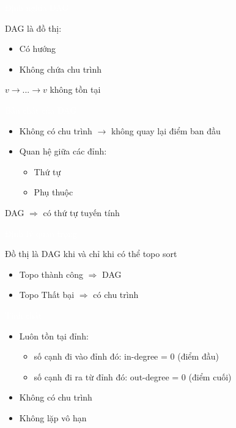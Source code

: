 \documentclass{beamer}
\title{\hlred{DAG - Directed Acyclic Graph}}
\author{Group 3}
\date{\hlcyan{03/2026}}
\newcommand{\hlblue}[1]{\textcolor{myblue}{#1}}
\newcommand{\hlgreen}[1]{\textcolor{mygreen}{#1}}
\newcommand{\hlred}[1]{\textcolor{myred}{#1}}
\newcommand{\hlpurple}[1]{\textcolor{mypurple}{#1}}
\newcommand{\hlwhite}[1]{\textcolor{white}{#1}}
\begin{document}
\frame{\titlepage}


\begin{frame}{\hlwhite{Định nghĩa DAG}}
\begin{tcolorbox}[title=\textbf{\hlwhite{Khái niệm DAG}}]
\hlblue{DAG} là đồ thị:
\begin{itemize}
\item Có hướng
\item Không chứa chu trình
\end{itemize}
\end{tcolorbox}

\begin{tcolorbox}
\centering
\hlpurple{$v \rightarrow ... \rightarrow v$ không tồn tại}
\end{tcolorbox}
\end{frame}

\begin{frame}{\hlwhite{Bản chất của DAG}}
\begin{itemize}
\item Không có chu trình $\rightarrow$ không quay lại điểm ban đầu
\item Quan hệ giữa các đỉnh:
\begin{itemize}
\item \hlblue{Thứ tự}
\item \hlblue{Phụ thuộc}
\end{itemize}
\end{itemize}

\begin{tcolorbox}
\centering
\hlpurple{DAG $\Rightarrow$ có thứ tự tuyến tính}
\end{tcolorbox}
\end{frame}

\begin{frame}{\hlwhite{Định lý quan trọng}}
\begin{tcolorbox}[title=\textbf{\hlwhite{Định lý}}]
Đồ thị là DAG \hlred{khi và chỉ khi} có thể topo sort
\end{tcolorbox}

\begin{itemize}
\item Topo thành công $\Rightarrow$ DAG
\item Topo Thất bại $\Rightarrow$ có chu trình
\end{itemize}
\end{frame}

\begin{frame}{\hlwhite{Tính chất}}
\begin{itemize}
\item Luôn tồn tại đỉnh:
\begin{itemize}
\item số cạnh đi vào đỉnh đó: \hlblue{in-degree = 0} (điểm đầu)
\item số cạnh đi ra từ đỉnh đó: \hlgreen{out-degree = 0} (điểm cuối)
\end{itemize}
\item Không có chu trình
\item Không lặp vô hạn
\end{itemize}
\end{frame}
\end{document}

